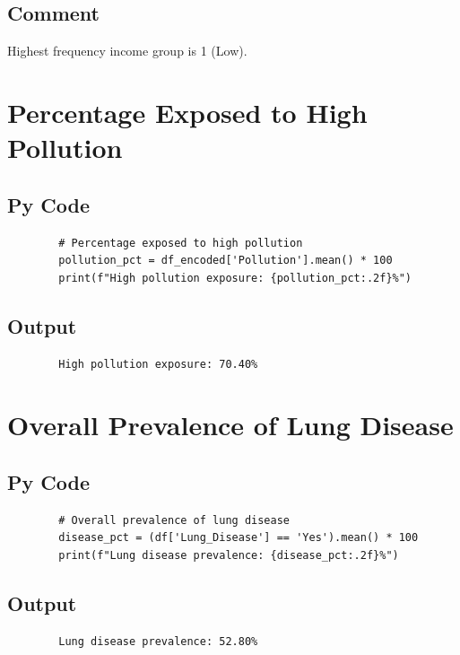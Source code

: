 \documentclass[a4paper,12pt]{article}
\begin{document}
	\subsection{Comment}
	Highest frequency income group is 1 (Low).
	
	
	\section{Percentage Exposed to High Pollution}
	
	\subsection{Py Code}
	\begin{lstlisting}
		# Percentage exposed to high pollution
		pollution_pct = df_encoded['Pollution'].mean() * 100
		print(f"High pollution exposure: {pollution_pct:.2f}%")
	\end{lstlisting}
	
	\subsection{Output}
	\begin{verbatim}
		High pollution exposure: 70.40%
	\end{verbatim}
	\section{Overall Prevalence of Lung Disease}
	
	\subsection{Py Code}
	\begin{lstlisting}
		# Overall prevalence of lung disease
		disease_pct = (df['Lung_Disease'] == 'Yes').mean() * 100
		print(f"Lung disease prevalence: {disease_pct:.2f}%")
	\end{lstlisting}
	
	\subsection{Output}
	\begin{verbatim}
		Lung disease prevalence: 52.80%
	\end{verbatim}
	
\end{document}
